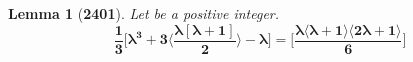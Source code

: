 \documentclass[preview]{standalone}
\newtheorem{lemma}{Lemma}
\begin{document}
\begin{lemma}[\textbf{2401}]
    Let \bm{$\lambda$} be a positive integer.
    \begin{equation*}
        \bm{
            \frac{1}{3} 
            \bigg[ 
                \lambda^3 
                    + 
                3 \bigg \langle 
                    \frac{ \lambda [ \lambda + 1 ] }{2} 
                \bigg \rangle
                    - 
                    \lambda 
            \bigg] 
                =
            \bigg[
                \frac{
                    \lambda
                    \langle \lambda + 1 \rangle 
                    \langle 2 \lambda + 1 \rangle}
                    {6}
            \bigg]
        }
    \end{equation*}
\end{lemma}
\end{document}
